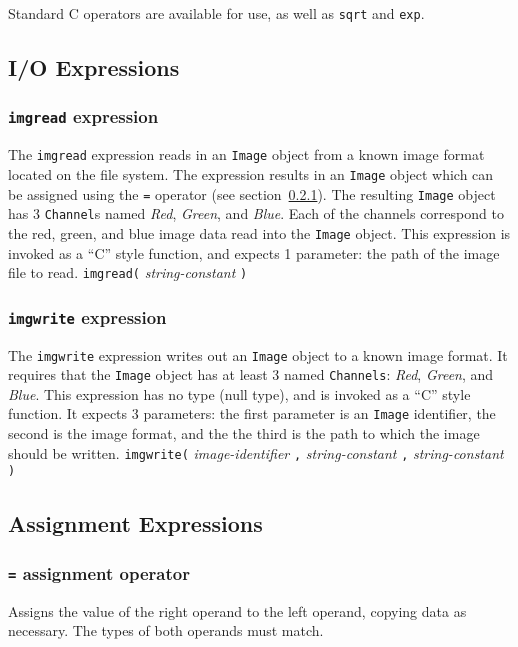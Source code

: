 Standard C operators are available for use, as well as \texttt{sqrt} and
\texttt{exp}.

\subsection{I/O Expressions}

\subsubsection{\texttt{imgread} expression}
\label{sssec:imgread}
The \texttt{imgread} expression reads in an \texttt{Image} object from
a known image format located on the file system. The expression results
in an \texttt{Image} object which can be assigned using the \texttt{=}
operator (see section~\ref{sssec:equalop}). The resulting \texttt{Image}
object has 3 \texttt{Channel}s named \emph{Red}, \emph{Green}, and
\emph{Blue}. Each of the channels correspond to the red, green, and blue
image data read into the \texttt{Image} object. This expression is invoked
as a ``C'' style function, and expects 1 parameter: the path of the image
file to read.
\startsyn
\texttt{imgread(} \emph{string-constant} \texttt{)}
\stopsyn

\subsubsection{\texttt{imgwrite} expression}
\label{sssec:imgwrite}
The \texttt{imgwrite} expression writes out an \texttt{Image} object to a known
image format. It requires that the \texttt{Image} object has at least 3 named
\texttt{Channels}: \emph{Red}, \emph{Green}, and \emph{Blue}.
This expression has no type (null type), and is invoked as a ``C'' style function.
It expects 3 parameters: the first parameter is an \texttt{Image} identifier, the
second is the image format, and the the third is the path to which the image
should be written.
\startsyn
\texttt{imgwrite(} \emph{image-identifier} \texttt{,} \emph{string-constant} \texttt{,} \emph{string-constant} \texttt{)}
\stopsyn

\subsection{Assignment Expressions}
\label{ssec:assignment}

\subsubsection{\texttt{=} assignment operator}
\label{sssec:equalop}
Assigns the value of the right operand to the left operand, copying data as necessary.
The types of both operands must match.

